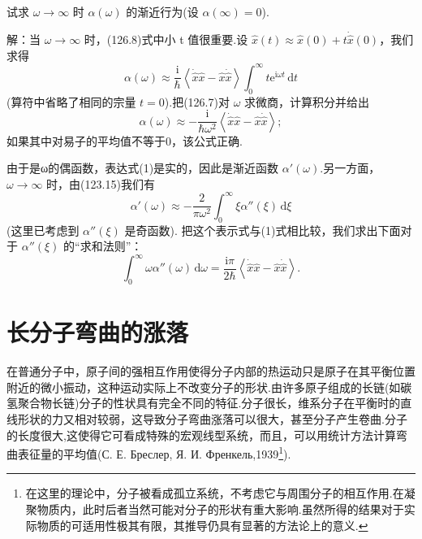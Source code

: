 \begin{xiti}

\quad 试求 $\omega\to\infty$ 时 $\alpha(\omega)$ 的渐近行为(设 $\alpha(\infty)=0$).

解：当 $\omega\to\infty$ 时，(126.8)式中小 t 值很重要.设 $\hat{x}(t)\approx\hat{x}(0)+t\dot{\hat{x}}(0)$，我们求得
\begin{equation*}
  \alpha(\omega)\approx\frac{\mathrm{i}}{\hbar}
  \left\langle\dot{\hat{x}}\hat{x}-\hat{x}\dot{\hat{x}}\right\rangle
  \int_0^{\infty}t\mathrm{e}^{\mathrm{i}\omega t}\,\mathrm{d}t
\end{equation*}
(算符中省略了相同的宗量 $t=0$).把(126.7)对 $\omega$ 求微商，计算积分并给出
\begin{equation*}
  \alpha(\omega)\approx-\frac{\mathrm{i}}{\hbar\omega^2}
  \left\langle\dot{\hat{x}}\hat{x}-\hat{x}\dot{\hat{x}}\right\rangle;\tag{1}
\end{equation*}
如果其中对易子的平均值不等于0，该公式正确.

由于是ω的偶函数，表达式(1)是实的，因此是渐近函数 $\alpha'(\omega)$.另一方面，$\omega\to\infty$ 时，由(123.15)我们有
\begin{equation*}
  \alpha'(\omega)\approx-\frac{2}{\pi\omega^2}\int_0^{\infty}
  \xi\alpha''(\xi)\,\mathrm{d}\xi
\end{equation*}
(这里已考虑到 $\alpha''(\xi)$ 是奇函数). 把这个表示式与(1)式相比较，我们求出下面对于 $\alpha''(\xi)$ 的“求和法则”：
\begin{equation*}
  \int_0^{\infty}\omega\alpha''(\omega)\,\mathrm{d}\omega
  =\frac{\mathrm{i}\pi}{2\hbar}
  \left\langle\dot{\hat{x}}\hat{x}-\hat{x}\dot{\hat{x}}\right\rangle.\tag{2}
\end{equation*}

\end{xiti}

\section{长分子弯曲的涨落}

在普通分子中，原子间的强相互作用使得分子内部的热运动只是原子在其平衡位置附近的微小振动，这种运动实际上不改变分子的形状.由许多原子组成的长链(如碳氢聚合物长链)分子的性状具有完全不同的特征.分子很长，维系分子在平衡时的直线形状的力又相对较弱，这导致分子弯曲涨落可以很大，甚至分子产生卷曲.分子的长度很大,这使得它可看成特殊的宏观线型系统，而且，可以用统计方法计算弯曲表征量的平均值(С. Е. Бреслер, Я. И. Френкель,1939\footnote{在这里的理论中，分子被看成孤立系统，不考虑它与周围分子的相互作用.在凝聚物质内，此时后者当然可能对分子的形状有重大影响.虽然所得的结果对于实际物质的可适用性极其有限，其推导仍具有显著的方法论上的意义.}).

